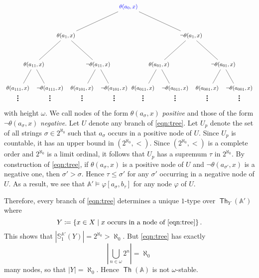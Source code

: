 \documentclass[10pt,letterpaper,cm]{nupset}
\theoremstyle{definition}
\theoremstyle{theorem}
\theoremstyle{remark}
\newcommand{\A}{\mathbb A}
\renewcommand{\S}{\mathbb S}
\newcommand{\1}{\mathbb{1}}
\newcommand{\0}{\vec 0}
\DeclareMathOperator{\thh}{\mathsf{Th}}
\begin{document}
\begin{solution}
\[\begin{tikzpicture}[level distance=1.8cm,
level 1/.style={sibling distance=7.8cm},
level 2/.style={sibling distance=4cm},
level 3/.style={sibling distance=2cm}]
\node (Root) [blue] {$\theta(a_0, x)$}
    child {
    node {$\theta(a_1, x)$} 
    child { node {$\theta(a_{11}, x)$}
    child { node { $\underset{\Huge\vdots}{\theta(a_{111},x)}$  }    }  child { node { $\underset{\Huge\vdots}{\neg{\theta(a_{111},x)}}$ }}}
    child { node {$\neg{\theta(a_{11}, x)}$} child { node { $\underset{\Huge\vdots}{\theta(a_{101},x)}$  }    }  child { node { $\underset{\Huge\vdots}{\neg{\theta(a_{101},x)}}$ }} }
}
child {
    node {$\neg{\theta(a_1, x)}$}
    child { node {$\theta(a_{01}, x)$} 
    child { node { $\underset{\Huge\vdots}{\theta(a_{011},x)}$  }    }  child { node { $\underset{\Huge\vdots}{\neg{\theta(a_{011},x)}}$ }}}
    child { node {$\neg{\theta(a_{01}, x)}$} 
    child { node { $\underset{\Huge\vdots}{\theta(a_{001},x)}$  }    }  child { node { $\underset{\Huge\vdots}{\neg{\theta(a_{001},x)}}$ }}}
};

\end{tikzpicture}
\] 
with height $\omega$. We call nodes of the form $\theta(a_{\sigma}, x)$ \textit{positive} and those of the form $\neg{\theta(a_{\sigma}, x)}$ \textit{negative}.  Let $U$ denote any branch of \eqref{eqn:tree}. Let $U_p$ denote the set of all strings $\sigma \in 2^{\aleph_0}$ such that $a_{\sigma}$ occurs in a positive node of $U$. Since $U_p$ is countable, it has an upper bound in $\left(2^{\aleph_0}, <\right)$. Since $\left(2^{\aleph_0}, <\right)$  is a complete order and  $2^{\aleph_0}$ is a limit ordinal, it follows that $U_p$ has a supremum $\tau$ in $2^{\aleph_0}$.  By construction of \eqref{eqn:tree}, if $\theta(a_{\sigma}, x)$ is a positive node of $U$ and $\neg{\theta(a_{\sigma'}, x)}$ is a negative one, then $\sigma' > \sigma$. Hence $\tau \leq \sigma'$ for any $\sigma'$ occurring in a negative node of $U$. As a result,  we see that $\A' \models \varphi[a_{\sigma}, b_{\tau}]$ for any node $\varphi$ of $U$.  

\smallskip

Therefore,  every branch of \eqref{eqn:tree} determines a unique $1$-type over $\thh_Y(\A')$ where $$Y \coloneqq \left\{x\in X \mid x \text{ occurs in a node of }\eqref{eqn:tree}\right\}.$$ This shows that $\left\lvert{\S_1^{\A'}(Y)}\right\rvert = 2^{\aleph_0} > \aleph_0$. But \eqref{eqn:tree} has exactly $$\left\lvert{\bigcup_{n\in \omega}2^n}\right\rvert = \aleph_0$$ many nodes, so that $\left\lvert{Y}\right\rvert = \aleph_0$. Hence $\thh(\A)$ is not $\omega$-stable. 

\end{solution}

\bigskip
\end{document}
